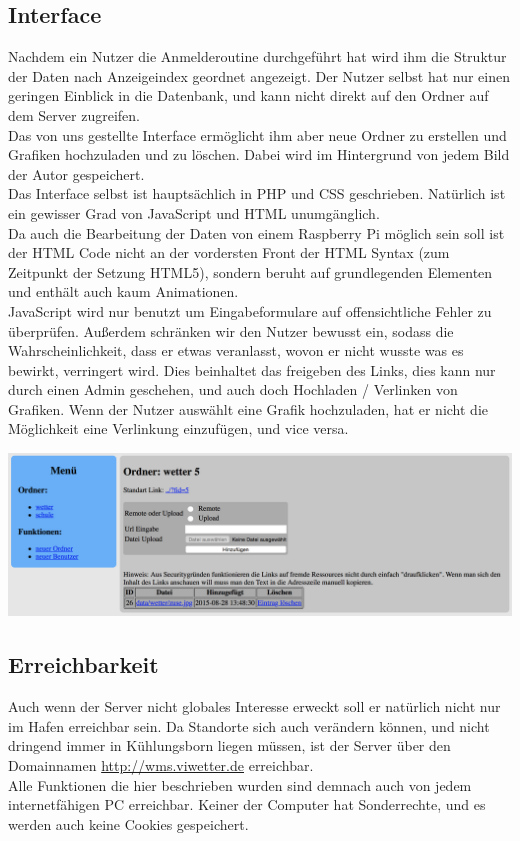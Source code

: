 \documentclass[a4paper,oneside,12pt,titlepage]{article}
\newcommand{\link}[1]{\textcolor{link}{\url{#1}}}	%
\begin{document}
\subsection{Interface} %
Nachdem ein Nutzer die Anmelderoutine durchgeführt hat wird ihm die Struktur der Daten nach Anzeigeindex geordnet angezeigt. Der Nutzer selbst hat nur einen geringen Einblick in die Datenbank, und kann nicht direkt auf den Ordner auf dem Server zugreifen.\\
Das von uns gestellte Interface ermöglicht ihm aber neue Ordner zu erstellen und Grafiken hochzuladen und zu löschen. Dabei wird im Hintergrund von jedem Bild der Autor gespeichert. \\
Das Interface selbst ist hauptsächlich in PHP und CSS geschrieben. Natürlich ist ein gewisser Grad von JavaScript und HTML unumgänglich. \\
Da auch die Bearbeitung der Daten von einem Raspberry Pi möglich sein soll ist der HTML Code nicht an der vordersten Front der HTML Syntax (zum Zeitpunkt der Setzung HTML5), sondern beruht auf grundlegenden Elementen und enthält auch kaum Animationen. \\
JavaScript wird nur benutzt um Eingabeformulare auf offensichtliche Fehler zu überprüfen. Außerdem schränken wir den Nutzer bewusst ein, sodass die Wahrscheinlichkeit, dass er etwas veranlasst, wovon er nicht wusste was es bewirkt, verringert wird. Dies beinhaltet das freigeben des Links, dies kann nur durch einen Admin geschehen, und auch doch Hochladen / Verlinken von Grafiken. Wenn der Nutzer auswählt eine Grafik hochzuladen, hat er nicht die Möglichkeit eine Verlinkung einzufügen, und vice versa.
\begin{center}
\includegraphics[width=\linewidth]{imgs/wms/wms_interface.png}
\end{center}

\subsection{Erreichbarkeit} %
Auch wenn der Server nicht globales Interesse erweckt soll er natürlich nicht nur im Hafen erreichbar sein. Da Standorte sich auch verändern können, und nicht dringend immer in Kühlungsborn liegen müssen, ist der Server über den Domainnamen \link{http://wms.viwetter.de} erreichbar. \\
Alle Funktionen die hier beschrieben wurden sind demnach auch von jedem internetfähigen PC erreichbar. Keiner der Computer hat Sonderrechte, und es werden auch keine Cookies gespeichert.
\end{document}
